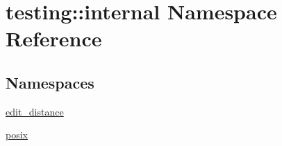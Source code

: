 \hypertarget{namespacetesting_1_1internal}{}\section{testing\+::internal Namespace Reference}
\label{namespacetesting_1_1internal}
\subsection*{Namespaces}
\begin{DoxyCompactItemize}
\item 
 \mbox{\hyperlink{namespacetesting_1_1internal_1_1edit__distance}{edit\+\_\+distance}}
\item 
 \mbox{\hyperlink{namespacetesting_1_1internal_1_1posix}{posix}}
\end{DoxyCompactItemize}
